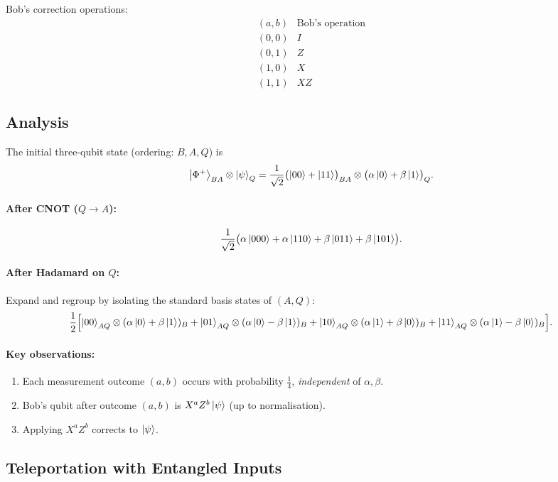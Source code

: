 \documentclass[11pt]{article}
\theoremstyle{definition}
\begin{document}
Bob's correction operations:
\[
\begin{array}{c|c}
(a,b) & \text{Bob's operation} \\\hline
(0,0) & I \\
(0,1) & Z \\
(1,0) & X \\
(1,1) & XZ
\end{array}
\]

\subsection{Analysis}

The initial three-qubit state (ordering: $B, A, Q$) is
\[
    \ket{\Phi^+}_{BA}\otimes\ket{\psi}_Q
    = \frac{1}{\sqrt{2}}\bigl(\ket{00}+\ket{11}\bigr)_{BA}\otimes\bigl(\alpha\ket{0}+\beta\ket{1}\bigr)_Q.
\]

\paragraph{After CNOT ($Q\to A$):}
\[
    \frac{1}{\sqrt{2}}\bigl(\alpha\ket{000}+\alpha\ket{110}+\beta\ket{011}+\beta\ket{101}\bigr).
\]

\paragraph{After Hadamard on $Q$:}
Expand and regroup by isolating the standard basis states of $(A,Q)$:
\[
    \frac{1}{2}\Bigl[
        \ket{00}_{AQ}\otimes(\alpha\ket{0}+\beta\ket{1})_B
        +\ket{01}_{AQ}\otimes(\alpha\ket{0}-\beta\ket{1})_B
        +\ket{10}_{AQ}\otimes(\alpha\ket{1}+\beta\ket{0})_B
        +\ket{11}_{AQ}\otimes(\alpha\ket{1}-\beta\ket{0})_B
    \Bigr].
\]

\paragraph{Key observations:}
\begin{enumerate}
    \item Each measurement outcome $(a,b)$ occurs with probability $\tfrac{1}{4}$, \emph{independent} of $\alpha,\beta$.
    \item Bob's qubit after outcome $(a,b)$ is $X^a Z^b\ket{\psi}$ (up to normalisation).
    \item Applying $X^a Z^b$ corrects to $\ket{\psi}$.
\end{enumerate}

\subsection{Teleportation with Entangled Inputs}
\end{document}

